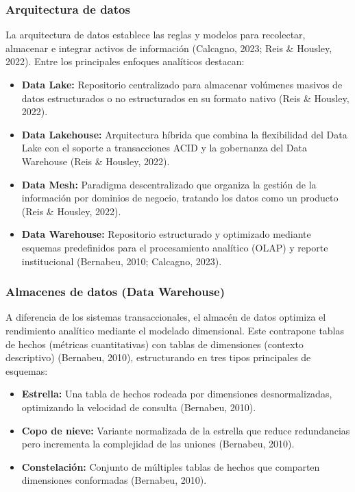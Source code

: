 \documentclass[11pt,oneside,openany]{book}
\begin{document}
\subsubsection*{Arquitectura de datos}

La arquitectura de datos establece las reglas y modelos para recolectar, almacenar e integrar activos de información (Calcagno, 2023; Reis \& Housley, 2022). Entre los principales enfoques analíticos destacan:

\begin{itemize}[leftmargin=*]
\item \textbf{Data Lake:} Repositorio centralizado para almacenar volúmenes masivos de datos estructurados o no estructurados en su formato nativo (Reis \& Housley, 2022).
\item \textbf{Data Lakehouse:} Arquitectura híbrida que combina la flexibilidad del Data Lake con el soporte a transacciones ACID y la gobernanza del Data Warehouse (Reis \& Housley, 2022).
\item \textbf{Data Mesh:} Paradigma descentralizado que organiza la gestión de la información por dominios de negocio, tratando los datos como un producto (Reis \& Housley, 2022).
\item \textbf{Data Warehouse:} Repositorio estructurado y optimizado mediante esquemas predefinidos para el procesamiento analítico (OLAP) y reporte institucional (Bernabeu, 2010; Calcagno, 2023).
\end{itemize}
\subsubsection*{Almacenes de datos (Data Warehouse)}

A diferencia de los sistemas transaccionales, el almacén de datos optimiza el rendimiento analítico mediante el modelado dimensional. Este contrapone tablas de hechos (métricas cuantitativas) con tablas de dimensiones (contexto descriptivo) (Bernabeu, 2010), estructurando en tres tipos principales de esquemas:

\begin{itemize}[leftmargin=*]
\item \textbf{Estrella:} Una tabla de hechos rodeada por dimensiones desnormalizadas, optimizando la velocidad de consulta (Bernabeu, 2010).
\item \textbf{Copo de nieve:} Variante normalizada de la estrella que reduce redundancias pero incrementa la complejidad de las uniones (Bernabeu, 2010).
\item \textbf{Constelación:} Conjunto de múltiples tablas de hechos que comparten dimensiones conformadas (Bernabeu, 2010).
\end{itemize}
\end{document}
